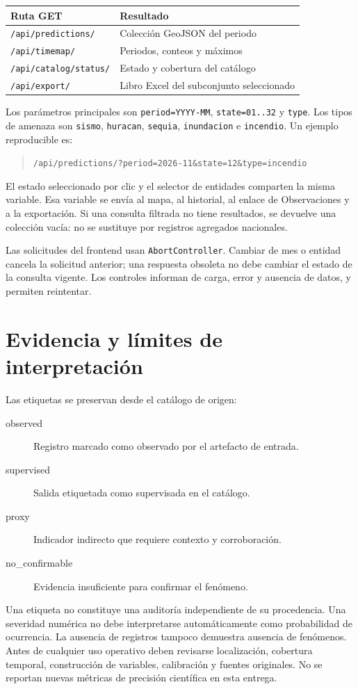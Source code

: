 \documentclass[11pt,a4paper]{article}
\begin{document}
\begin{tabular}{ll}
\textbf{Ruta GET} & \textbf{Resultado}\\ \hline
\texttt{/api/predictions/} & Colección GeoJSON del periodo\\
\texttt{/api/timemap/} & Periodos, conteos y máximos\\
\texttt{/api/catalog/status/} & Estado y cobertura del catálogo\\
\texttt{/api/export/} & Libro Excel del subconjunto seleccionado\\
\end{tabular}

Los parámetros principales son \texttt{period=YYYY-MM}, \texttt{state=01..32} y \texttt{type}. Los tipos de amenaza son \texttt{sismo}, \texttt{huracan}, \texttt{sequia}, \texttt{inundacion} e \texttt{incendio}. Un ejemplo reproducible es:
\begin{quote}\small\texttt{/api/predictions/?period=2026-11\&state=12\&type=incendio}\end{quote}
El estado seleccionado por clic y el selector de entidades comparten la misma variable. Esa variable se envía al mapa, al historial, al enlace de Observaciones y a la exportación. Si una consulta filtrada no tiene resultados, se devuelve una colección vacía: no se sustituye por registros agregados nacionales.

Las solicitudes del frontend usan \texttt{AbortController}. Cambiar de mes o entidad cancela la solicitud anterior; una respuesta obsoleta no debe cambiar el estado de la consulta vigente. Los controles informan de carga, error y ausencia de datos, y permiten reintentar.

\section{Evidencia y límites de interpretación}
Las etiquetas se preservan desde el catálogo de origen:
\begin{description}
\item[observed] Registro marcado como observado por el artefacto de entrada.
\item[supervised] Salida etiquetada como supervisada en el catálogo.
\item[proxy] Indicador indirecto que requiere contexto y corroboración.
\item[no\_confirmable] Evidencia insuficiente para confirmar el fenómeno.
\end{description}
Una etiqueta no constituye una auditoría independiente de su procedencia. Una severidad numérica no debe interpretarse automáticamente como probabilidad de ocurrencia. La ausencia de registros tampoco demuestra ausencia de fenómenos. Antes de cualquier uso operativo deben revisarse localización, cobertura temporal, construcción de variables, calibración y fuentes originales. No se reportan nuevas métricas de precisión científica en esta entrega.
\end{document}

